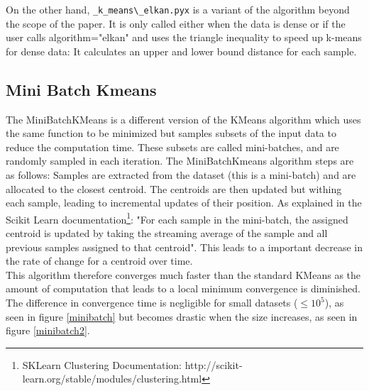 \documentclass[11pt]{article}
\begin{document}
\noindent On the other hand, \verb|_k_means\_elkan.pyx| is a variant of the algorithm beyond the scope of the paper. It is only called either when the data is dense or if the user calls algorithm="elkan" and uses the triangle inequality to speed up k-means for dense data: It calculates an upper and lower bound distance for each sample. 

\subsection*{Mini Batch Kmeans}
The MiniBatchKMeans is a different version of the KMeans algorithm which uses the same function to be minimized but samples subsets of the input data to reduce the computation time. These subsets are called mini-batches, and are randomly sampled in each iteration. The MiniBatchKmeans algorithm steps are as follows: Samples are extracted from the dataset (this is a mini-batch) and are allocated to the closest centroid. The centroids are then updated but withing each sample, leading to incremental updates of their position. As explained in the Scikit Learn documentation\footnote{SKLearn Clustering Documentation: http://scikit-learn.org/stable/modules/clustering.html}:
"For each sample in the mini-batch, the assigned centroid is updated by taking the streaming average of the sample and all previous samples assigned to that centroid". 
This leads to a important decrease in the rate of change for a centroid over time.\\

\noindent This algorithm therefore converges much faster than the standard KMeans as the amount of computation that leads to a local minimum convergence is diminished. The difference in convergence time is negligible for small datasets ($\leq 10^5$), as seen in figure \ref{minibatch} but becomes drastic when the size increases, as seen in figure \ref{minibatch2}.\\
\end{document}
